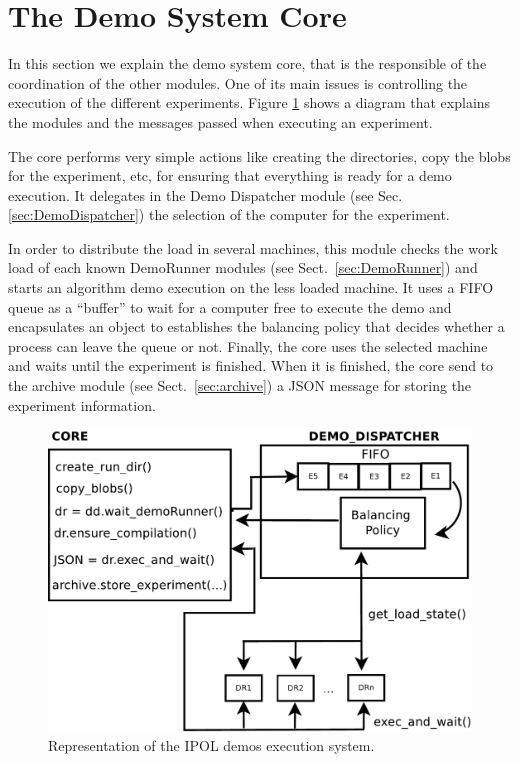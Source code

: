 \section{The Demo System Core}

In this section we explain the demo system core, that is the responsible of the coordination of the other modules. One of its main issues is controlling the execution of the different experiments. Figure \ref{fig:core_diagram} shows a diagram that explains the modules and the messages passed when executing an experiment.

The core performs very simple actions like creating the directories, copy the blobs for the experiment, etc, for ensuring that everything is ready for a demo execution. It delegates in the Demo Dispatcher module (see Sec. \ref{sec:DemoDispatcher}) the selection of the computer for the experiment.

In order to distribute the load in several machines, this module checks the work load of each known DemoRunner modules (see Sect.~\ref{sec:DemoRunner}) and starts an algorithm demo execution on the less loaded machine. It uses a FIFO queue as a ``buffer'' to wait for a computer free to execute the demo and encapsulates an object to establishes the balancing policy that decides whether a process can leave the queue or not. Finally, the core uses the selected machine and waits until the experiment is finished. When it is finished, the core send to the archive module (see Sect.~\ref{sec:archive}) a JSON message for storing the experiment information.


\begin{figure}[!ht]
\centering
\includegraphics[width=0.7\columnwidth]{core/images/core_diagram.pdf}
\caption{Representation of the IPOL demos execution system.} 
\label{fig:core_diagram}
\end{figure}


